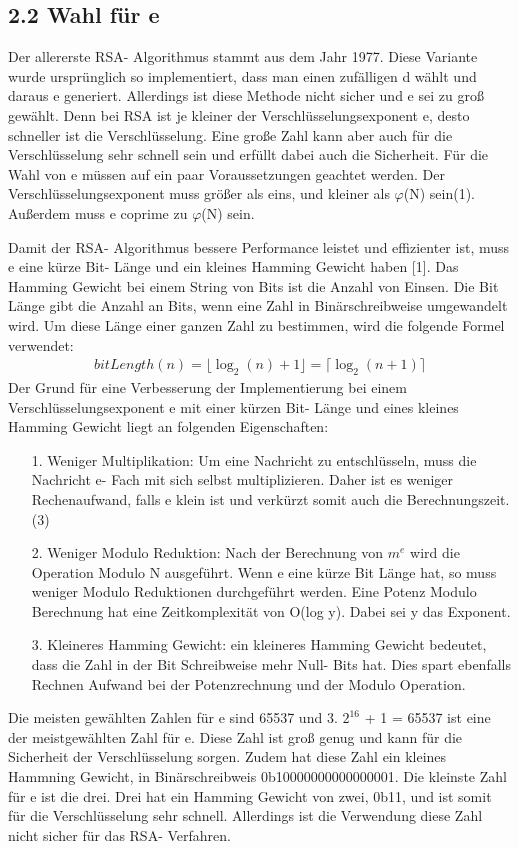 \documentclass[course=asp]{aspdoc}
\begin{document}
\subsection*{2.2 Wahl für e }
Der allererste RSA- Algorithmus stammt aus dem Jahr 1977. Diese Variante wurde ursprünglich so implementiert, dass man einen zufälligen d wählt und daraus e generiert. Allerdings ist diese Methode nicht sicher und e sei zu groß gewählt. Denn bei RSA ist je kleiner der Verschlüsselungsexponent e, desto schneller ist die Verschlüsselung. Eine große Zahl kann aber auch für die Verschlüsselung sehr schnell sein und erfüllt dabei auch die Sicherheit. Für die Wahl von e müssen auf ein paar Voraussetzungen geachtet werden. Der Verschlüsselungsexponent muss größer als eins, und kleiner als $\varphi $(N) sein(1). Außerdem muss e coprime zu $\varphi $(N) sein.

Damit der RSA- Algorithmus bessere Performance leistet und effizienter ist, muss e eine kürze Bit- Länge und ein kleines Hamming Gewicht haben [1]. Das Hamming Gewicht bei einem String von Bits ist die Anzahl von Einsen. Die Bit Länge gibt die Anzahl an Bits, wenn eine Zahl in Binärschreibweise umgewandelt wird. Um diese Länge einer ganzen Zahl zu bestimmen, wird die folgende Formel verwendet:
\begin{align}
	bitLength(n) = \lfloor \log_{2}(n) + 1 \rfloor = \lceil \log_{2}(n + 1)\rceil
\end{align}
Der Grund für eine Verbesserung der Implementierung bei einem Verschlüsselungsexponent e mit einer kürzen Bit- Länge und eines kleines Hamming Gewicht liegt an folgenden Eigenschaften:
\begin{itemize}
 \item [1.] Weniger Multiplikation: Um eine Nachricht zu entschlüsseln, muss die Nachricht e- Fach mit sich selbst multiplizieren. Daher ist es weniger Rechenaufwand, falls e klein ist und verkürzt somit auch die Berechnungszeit.(3)
 \item [2.] Weniger Modulo Reduktion: Nach der Berechnung von $m^{e}$ wird die Operation Modulo N ausgeführt. Wenn e eine kürze Bit Länge hat, so muss weniger Modulo Reduktionen durchgeführt werden. Eine Potenz Modulo Berechnung hat eine Zeitkomplexität von O(log y). Dabei sei y das Exponent.   
 \item [3.] Kleineres Hamming Gewicht: ein kleineres Hamming Gewicht bedeutet, dass die Zahl in der Bit Schreibweise mehr Null- Bits hat. Dies spart ebenfalls Rechnen Aufwand bei der Potenzrechnung und der Modulo Operation.
\end{itemize}
Die meisten gewählten Zahlen für e sind 65537 und 3. $2^{16}$ + 1 = 65537 ist eine der meistgewählten Zahl für e. Diese Zahl ist groß genug und kann für die Sicherheit der Verschlüsselung sorgen. Zudem hat diese Zahl ein kleines Hammning Gewicht, in Binärschreibweis 0b10000000000000001. Die kleinste Zahl für e ist die drei. Drei hat ein Hamming Gewicht von zwei, 0b11, und ist somit für die Verschlüsselung sehr schnell. Allerdings ist die Verwendung diese Zahl nicht sicher für das RSA- Verfahren. 
\end{document}
